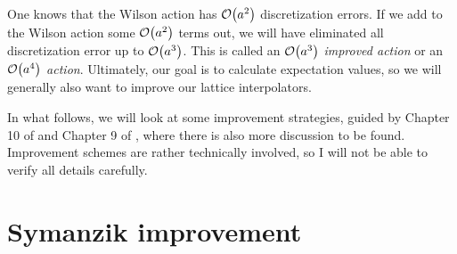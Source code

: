 One knows that the Wilson action has
$\order{a^2}$ discretization errors. If we add to the Wilson action some
$\order{a^2}$ terms out, we will have eliminated all discretization error
up to $\order{a^3}$. This is called an $\order{a^3}$ {\it improved action}
or an $\order{a^4}$ {\it action}. Ultimately, our goal is to calculate
expectation values, so we will generally also want to improve our 
lattice interpolators. 

In what follows, we will look at some improvement strategies, guided by 
Chapter 10 of \cite{degrand_lattice_2006} and Chapter 9 of
\cite{gattringer_quantum_2010}, where there is also more discussion to 
be found. Improvement schemes are rather technically
involved, so I will not be able to verify all details carefully.

\section{Symanzik improvement}\label{sec:symanzikImprovement}

